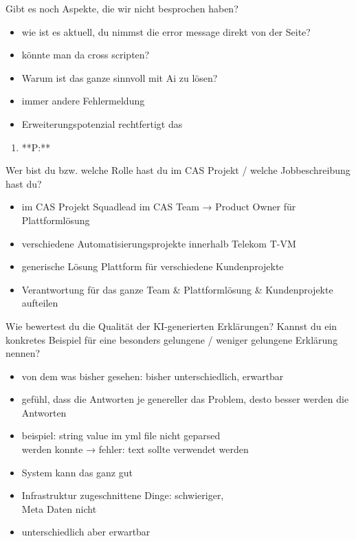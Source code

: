 \documentclass[
  a4paper,
  12pt,
  oneside,
  open=any,
  BCOR=12mm,
  DIV=14,
  parskip=half*,
  headsepline,
  footsepline,
  pointlessnumbers,
  liststotoc,
  numbers=noenddot,
  listof=totoc]{scrartcl}
\providecommand{\tightlist}{%
  \setlength{\itemsep}{0pt}\setlength{\parskip}{0pt}}\usepackage{longtable,booktabs,array}
\begin{document}
Gibt es noch Aspekte, die wir nicht besprochen haben?

\begin{itemize}
\tightlist
\item
  wie ist es aktuell, du nimmst die error message direkt von der Seite?
\item
  könnte man da cross scripten?
\item
  Warum ist das ganze sinnvoll mit Ai zu lösen?
\item
  immer andere Fehlermeldung
\item
  Erweiterungspotenzial rechtfertigt das
\end{itemize}

\begin{enumerate}
\def\labelenumi{\arabic{enumi}.}
\tightlist
\item
  **P:**
\end{enumerate}

Wer bist du bzw. welche Rolle hast du im CAS Projekt / welche
Jobbeschreibung hast du?

\begin{itemize}
\tightlist
\item
  im CAS Projekt Squadlead im CAS Team → Product Owner für
  Plattformlösung
\item
  verschiedene Automatisierungsprojekte innerhalb Telekom T-VM
\item
  generische Lösung Plattform für verschiedene Kundenprojekte
\item
  Verantwortung für das ganze Team \& Plattformlösung \& Kundenprojekte
  aufteilen
\end{itemize}

Wie bewertest du die Qualität der KI-generierten Erklärungen? Kannst du
ein konkretes Beispiel für eine besonders gelungene / weniger gelungene
Erklärung nennen?

\begin{itemize}
\tightlist
\item
  von dem was bisher gesehen: bisher unterschiedlich, erwartbar
\item
  gefühl, dass die Antworten je genereller das Problem, desto besser
  werden die Antworten
\item
  beispiel: string value im yml file nicht geparsed\\
  werden konnte → fehler: text sollte verwendet werden
\item
  System kann das ganz gut
\item
  Infrastruktur zugeschnittene Dinge: schwieriger,\\
  Meta Daten nicht
\item
  unterschiedlich aber erwartbar
\end{itemize}
\end{document}
